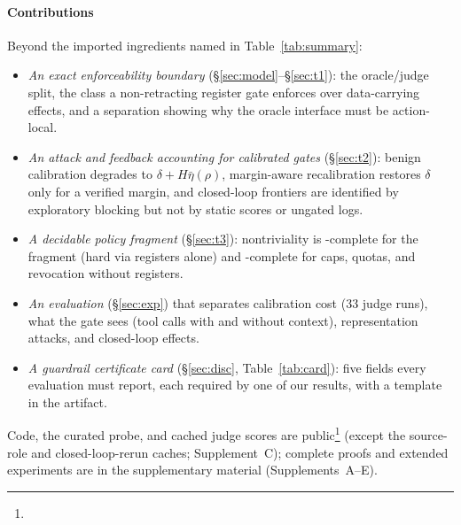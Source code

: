 \paragraph{Contributions} Beyond the imported ingredients named in Table~\ref{tab:summary}:
\begin{itemize}[\setlength{\IEEElabelindent}{0pt}\IEEEsetlabelwidth{$\bullet$}]
  \item \emph{An exact enforceability boundary} (\S\ref{sec:model}--\S\ref{sec:t1}): the oracle/judge
  split, the class a non-retracting register gate enforces over data-carrying effects, and a separation
  showing why the oracle interface must be action-local.
  \item \emph{An attack and feedback accounting for calibrated gates} (\S\ref{sec:t2}): benign calibration
  degrades to $\delta+H\bar\eta(\rho)$, margin-aware recalibration restores $\delta$ only for a verified
  margin, and closed-loop frontiers are identified by exploratory blocking but not by static scores or
  ungated logs.
  \item \emph{A decidable policy fragment} (\S\ref{sec:t3}): nontriviality is \PSPACE-complete for the fragment (hard via registers
  alone) and \NP-complete for caps, quotas, and revocation without registers.
  \item \emph{An evaluation} (\S\ref{sec:exp}) that separates calibration cost (33 judge runs), what the
  gate sees (tool calls with and without context), representation attacks, and closed-loop effects.
  \item \emph{A guardrail certificate card} (\S\ref{sec:disc}, Table~\ref{tab:card}): five fields every
  evaluation must report, each required by one of our results, with a template in the artifact.
\end{itemize}
Code, the curated probe, and cached judge scores are public\footnote{\artifactURL} (except the
source-role and closed-loop-rerun caches; Supplement~C); complete
proofs and extended experiments are in the supplementary material (Supplements~A--E).
